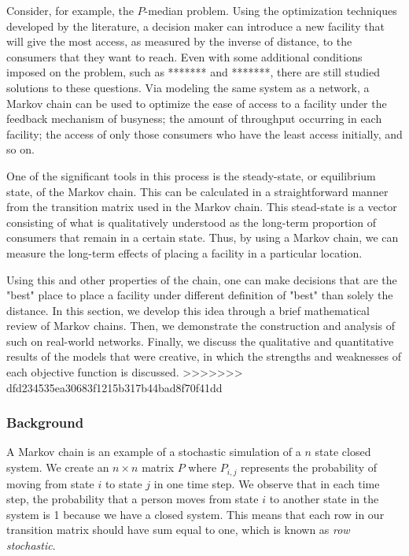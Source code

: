 \documentclass[twoside,twocolumn]{article}
\begin{document}
Consider, for example, the $P$-median problem. 
Using the optimization techniques developed by the literature, a decision maker can introduce a new facility that will give the most access, as measured by the inverse of distance, to the consumers that they want to reach. %
Even with some additional conditions imposed on the problem, such as ******* and *******, there are still studied solutions to these questions.%
Via modeling the same system as a network, a Markov chain can be used to optimize the ease of access to a facility under the feedback mechanism of busyness; the amount of throughput occurring in each facility; the access of only those consumers who have the least access initially, and so on.

One of the significant tools in this process is the steady-state, or equilibrium state, of the Markov chain.
This can be calculated in a straightforward manner from the transition matrix used in the Markov chain.
This stead-state is a vector consisting of what is qualitatively understood as the long-term proportion of consumers that remain in a certain state. %
Thus, by using a Markov chain, we can measure the long-term effects of placing a facility in a particular location.

Using this and other properties of the chain, one can make decisions that are the "best" place to place a facility under different definition of "best" than solely the distance.
In this section, we develop this idea through a brief mathematical review of Markov chains.
Then, we demonstrate the construction and analysis of such on real-world networks.
Finally, we discuss the qualitative and quantitative results of the models that were creative, in which the strengths and weaknesses of each objective function is discussed.
>>>>>>> dfd234535ea30683f1215b317b44bad8f70f41dd

\subsubsection{Background}

A Markov chain is an example of a stochastic simulation of a $n$ state closed system.
We create an $n\times n$ matrix $P$ where $P_{i,j}$ represents the probability of moving from state $i$ to state $j$ in one time step.
We observe that in each time step, the probability that a person moves from state $i$ to another state in the system is 1 because we have a closed system.
This means that each row in our transition matrix should have sum equal to one, which is known as {\em row stochastic}.
\end{document}
